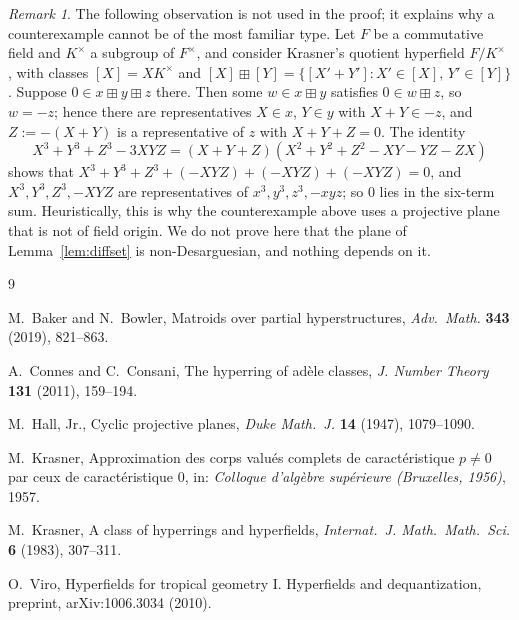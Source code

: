 \documentclass[11pt]{article}
\theoremstyle{definition}
\theoremstyle{remark}
\newtheorem{remark}[theorem]{Remark}
\newcommand{\bp}{\boxplus}
\begin{document}
\begin{remark}\label{rem:quotient}
The following observation is not used in the proof; it explains why a counterexample cannot be of the most familiar type. Let $F$ be a commutative field and $K^\times$ a subgroup of $F^\times$, and consider Krasner's quotient hyperfield $F/K^\times$ \cite{Kr83}, with classes $[X]=XK^\times$ and $[X]\bp[Y]=\{[X'+Y']:X'\in[X],\,Y'\in[Y]\}$. Suppose $0\in x\bp y\bp z$ there. Then some $w\in x\bp y$ satisfies $0\in w\bp z$, so $w=-z$; hence there are representatives $X\in x$, $Y\in y$ with $X+Y\in -z$, and $Z:=-(X+Y)$ is a representative of $z$ with $X+Y+Z=0$. The identity
\[
X^3+Y^3+Z^3-3XYZ=(X+Y+Z)(X^2+Y^2+Z^2-XY-YZ-ZX)
\]
shows that $X^3+Y^3+Z^3+(-XYZ)+(-XYZ)+(-XYZ)=0$, and $X^3,Y^3,Z^3,-XYZ$ are representatives of $x^3,y^3,z^3,-xyz$; so $0$ lies in the six-term sum. Heuristically, this is why the counterexample above uses a projective plane that is not of field origin. We do not prove here that the plane of Lemma~\ref{lem:diffset} is non-Desarguesian, and nothing depends on it.
\end{remark}

\begin{thebibliography}{9}

M.~Baker and N.~Bowler,
Matroids over partial hyperstructures,
\emph{Adv.\ Math.} \textbf{343} (2019), 821--863.

A.~Connes and C.~Consani,
The hyperring of ad\`ele classes,
\emph{J. Number Theory} \textbf{131} (2011), 159--194.

M.~Hall, Jr.,
Cyclic projective planes,
\emph{Duke Math.\ J.} \textbf{14} (1947), 1079--1090.

M.~Krasner,
Approximation des corps valu\'es complets de caract\'eristique $p\neq0$ par ceux de caract\'eristique $0$,
in: \emph{Colloque d'alg\`ebre sup\'erieure (Bruxelles, 1956)}, 1957.

M.~Krasner,
A class of hyperrings and hyperfields,
\emph{Internat.\ J. Math.\ Math.\ Sci.} \textbf{6} (1983), 307--311.

O.~Viro,
Hyperfields for tropical geometry I. Hyperfields and dequantization,
preprint, arXiv:1006.3034 (2010).

\end{thebibliography}
\end{document}
